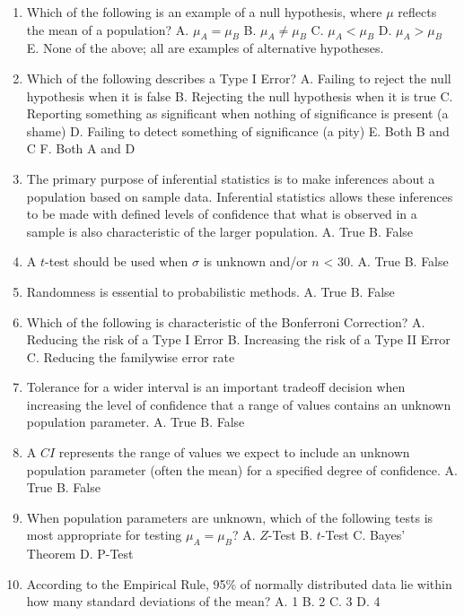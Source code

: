 \documentclass[]{book}
\begin{document}
\begin{enumerate}
\def\labelenumi{\arabic{enumi}.}
\item
  Which of the following is an example of a null hypothesis, where \(\mu\) reflects the mean of a population?
  A. \(\mu_A = \mu_B\)
  B. \(\mu_A \neq \mu_B\)
  C. \(\mu_A < \mu_B\)
  D. \(\mu_A > \mu_B\)
  E. None of the above; all are examples of alternative hypotheses.
\item
  Which of the following describes a Type I Error?
  A. Failing to reject the null hypothesis when it is false
  B. Rejecting the null hypothesis when it is true
  C. Reporting something as significant when nothing of significance is present (a shame)
  D. Failing to detect something of significance (a pity)
  E. Both B and C
  F. Both A and D
\item
  The primary purpose of inferential statistics is to make inferences about a population based on sample data. Inferential statistics allows these inferences to be made with defined levels of confidence that what is observed in a sample is also characteristic of the larger population.
  A. True
  B. False
\item
  A \(t\)-test should be used when \(\sigma\) is unknown and/or \(n\) \textless{} 30.
  A. True
  B. False
\item
  Randomness is essential to probabilistic methods.
  A. True
  B. False
\item
  Which of the following is characteristic of the Bonferroni Correction?
  A. Reducing the risk of a Type I Error
  B. Increasing the risk of a Type II Error
  C. Reducing the familywise error rate
\item
  Tolerance for a wider interval is an important tradeoff decision when increasing the level of confidence that a range of values contains an unknown population parameter.
  A. True
  B. False
\item
  A \(CI\) represents the range of values we expect to include an unknown population parameter (often the mean) for a specified degree of confidence.
  A. True
  B. False
\item
  When population parameters are unknown, which of the following tests is most appropriate for testing \(\mu_A = \mu_B\)?
  A. \(Z\)-Test
  B. \(t\)-Test
  C. Bayes' Theorem
  D. P-Test
\item
  According to the Empirical Rule, 95\% of normally distributed data lie within how many standard deviations of the mean?
  A. 1
  B. 2
  C. 3
  D. 4
\end{enumerate}
\end{document}
